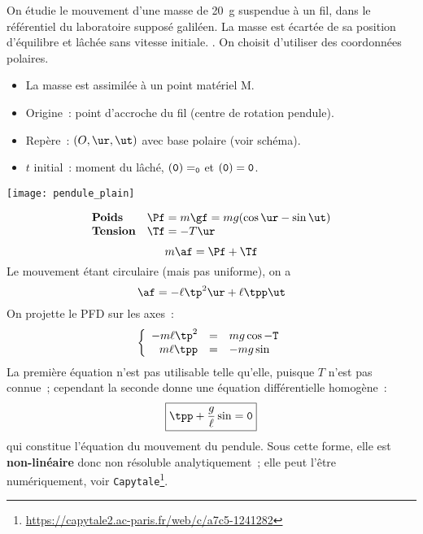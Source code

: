 \documentclass[../main/main.tex]{subfiles}
\begin{document}
\hspace*{-0.75cm}
\begin{minipage}{0.70\linewidth}
    \begin{enumerate}[label=\sqenumi]
         On étudie le mouvement d'une masse de
            \SI{20}{g} suspendue à un fil, dans le référentiel du laboratoire
            supposé galiléen. La masse est écartée de sa position d'équilibre et
            lâchée sans vitesse initiale.
        .
         On choisit d'utiliser des coordonnées polaires.
            \begin{itemize}
                \item La masse est assimilée à un point matériel M.
                \item Origine~: point d'accroche du fil (centre de rotation
                    pendule).
                \item Repère~: $(O,\ur,\ut)$ avec base polaire (voir schéma).
                \item $t$ initial~: moment du lâché, $\tt(0) = \tt_0$ et
                    $\tt(0) = 0$.
            \end{itemize}
    \end{enumerate}
\end{minipage}
\hfill
\begin{minipage}{0.25\linewidth}
    \begin{center}
        \texttt{[image: pendule\_plain]}
    \end{center}
\end{minipage}
\begin{enumerate}[label=\sqenumi, start=4]
        \[
            \begin{array}{ll}
                \textbf{Poids} & \Pf = m\gf = mg(\cos\tt \ur - \sin\tt \ut)\\
                \textbf{Tension} & \Tf = -T\ur
            \end{array}
        \]
        \[m\af = \Pf + \Tf\]
        Le mouvement étant circulaire (mais pas uniforme), on a
        \[\af = -\ell\tp^2 \ur + \ell\tpp \ut\]
     On projette le PFD sur les axes~:
        \[
            \left\{
                \begin{array}{rcl}
                    -m\ell\tp^2 & = & mg\cos\tt - T\\
                     m\ell\tpp & = & -mg\sin\tt
                \end{array}
            \right.
        \]
     La première équation n'est pas utilisable telle qu'elle,
        puisque $T$ n'est pas connue~; cependant la seconde donne une équation
        différentielle homogène~:
        \[\boxed{\tpp + \frac{g}{\ell}\sin\tt = 0}\]
        qui constitue l'équation du mouvement du pendule. Sous cette forme, elle
        est \textbf{non-linéaire} donc non résoluble analytiquement~; elle peut
        l'être numériquement, voir
        \texttt{Capytale}\footnote{\url{
        https://capytale2.ac-paris.fr/web/c/a7c5-1241282}}.
\end{enumerate}
\end{document}

